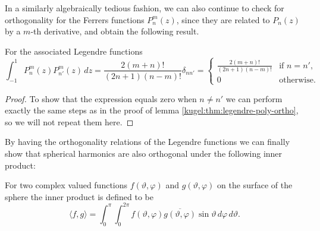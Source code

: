 In a similarly algebraically tedious fashion, we can also continue to check for
orthogonality for the Ferrers functions $P^m_n(z)$, since they are related to
$P_n(z)$ by a $m$-th derivative, and obtain the following result.

\begin{lemma} For the associated Legendre functions
  \label{kugel:thm:associated-legendre-ortho}
  \begin{equation*}
    \int_{-1}^1 P^m_n(z) P^{m}_{n'}(z) \, dz
    = \frac{2(m + n)!}{(2n + 1)(n - m)!} \delta_{nn'}
    = \begin{cases}
      \frac{2(m + n)!}{(2n + 1)(n - m)!}
        & \text{if } n = n', \\
      0 & \text{otherwise}.
    \end{cases}
  \end{equation*}
\end{lemma}
\begin{proof}
  To show that the expression equals zero when $n \neq n'$ we can perform
  exactly the same steps as in the proof of lemma
  \ref{kugel:thm:legendre-poly-ortho}, so we will not repeat them here.
\end{proof}

By having the orthogonality relations of the Legendre functions we can finally
show that spherical harmonics are also orthogonal under the following inner
product:

\begin{definition}
  \label{kugel:def:inner-product-s2}
  For two complex valued functions $f(\vartheta, \varphi)$ and $g(\vartheta,
  \varphi)$ on the surface of the sphere the inner product is defined to be
  \begin{equation*}
    \langle f, g \rangle
    = \int_{0}^\pi \int_0^{2\pi}
      f(\vartheta, \varphi) \overline{g(\vartheta, \varphi)}
      \sin \vartheta \, d\varphi \, d\vartheta.
  \end{equation*}
\end{definition}


